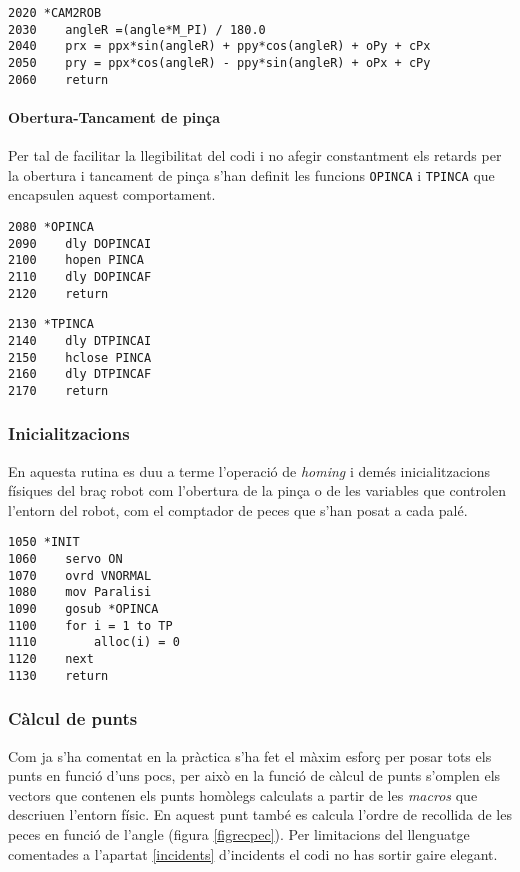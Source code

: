 \begin{verbatim}
2020 *CAM2ROB
2030    angleR =(angle*M_PI) / 180.0
2040    prx = ppx*sin(angleR) + ppy*cos(angleR) + oPy + cPx
2050    pry = ppx*cos(angleR) - ppy*sin(angleR) + oPx + cPy
2060    return
\end{verbatim}

\paragraph{Obertura-Tancament de pinça}
Per tal de facilitar la llegibilitat del codi i no afegir constantment
els retards per la obertura i tancament de pinça s'han definit les funcions
\texttt{OPINCA} i \texttt{TPINCA} que encapsulen aquest comportament.

\begin{verbatim}
2080 *OPINCA
2090    dly DOPINCAI
2100    hopen PINCA
2110    dly DOPINCAF
2120    return
\end{verbatim}
\begin{verbatim}
2130 *TPINCA
2140    dly DTPINCAI
2150    hclose PINCA
2160    dly DTPINCAF
2170    return
\end{verbatim}

\subsubsection{Inicialitzacions}
En aquesta rutina es duu a terme l'operació de \emph{homing} i demés
inicialitzacions físiques del braç robot com l'obertura de la pinça
o de les variables que controlen l'entorn del robot, com el 
comptador de peces que s'han posat a cada palé.

\begin{verbatim}
1050 *INIT
1060    servo ON
1070    ovrd VNORMAL
1080    mov Paralisi
1090    gosub *OPINCA
1100    for i = 1 to TP
1110        alloc(i) = 0
1120    next
1130    return
\end{verbatim}

\subsubsection{Càlcul de punts}\label{codcalcpts}
Com ja s'ha comentat en la pràctica s'ha fet el màxim esforç per posar tots els
punts en funció d'uns pocs, per això en la funció de càlcul de punts s'omplen
els vectors que contenen els punts homòlegs calculats a partir de les
\emph{macros} que descriuen l'entorn físic. En aquest punt també es calcula
l'ordre de recollida de les peces en funció de l'angle (figura \ref{figrecpec}).
Per limitacions del
llenguatge comentades a l'apartat \ref{incidents} d'incidents el codi no has
sortir gaire elegant.

